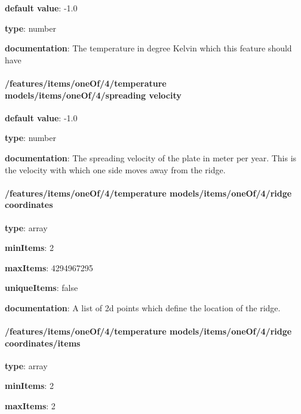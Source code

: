 \begin{itemized}
\item {\bf default value}: -1.0
\item {\bf type}: number
\item {\bf documentation}: The temperature in degree Kelvin which this feature should have
\end{itemized}\paragraph{/features/items/oneOf/4/temperature models/items/oneOf/4/spreading velocity} \begin{itemized}
\item {\bf default value}: -1.0
\item {\bf type}: number
\item {\bf documentation}: The spreading velocity of the plate in meter per year. This is the velocity with which one side moves away from the ridge.
\end{itemized}\paragraph{/features/items/oneOf/4/temperature models/items/oneOf/4/ridge coordinates} \begin{itemized}
\item {\bf type}: array
\item {\bf minItems}: 2
\item {\bf maxItems}: 4294967295
\item {\bf uniqueItems}: false
\item {\bf documentation}: A list of 2d points which define the location of the ridge.
\paragraph{/features/items/oneOf/4/temperature models/items/oneOf/4/ridge coordinates/items} \begin{itemized}
\item {\bf type}: array
\item {\bf minItems}: 2
\item {\bf maxItems}: 2

\end{itemized}
\end{itemized}
